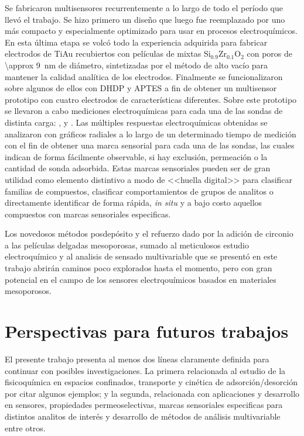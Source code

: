  Se fabricaron multisensores recurrentemente a lo largo de todo el período que llevó el trabajo. Se hizo primero un diseño que luego fue reemplazado por uno más compacto y especialmente optimizado para usar en procesos electroquímicos. En esta última etapa se volcó todo la experiencia adquirida para fabricar electrodos de Ti\textbar Au recubiertos con películas de mixtas Si$_{0.9}$Zr$_{0.1}$O$_2$ con poros de \SI{\approx 9}{\nm} de diámetro, sintetizadas por el método de alto vacío para mantener la calidad analítica de los electrodos. Finalmente se funcionalizaron sobre algunos de ellos con DHDP y APTES a fin de obtener un multisensor prototipo con cuatro electrodos de características diferentes. Sobre este prototipo se llevaron a cabo mediciones electroquímicas para cada una de las sondas de distinta carga: \ferroferri, \ferroceno\space y \aminorutenio. Las múltiples respuestas electroquímicas obtenidas se analizaron con gráficos radiales a lo largo de un determinado tiempo de medición con el fin de obtener una marca sensorial para cada una de las sondas, las cuales indican de forma fácilmente observable, si hay exclusión, permeación o la cantidad de sonda adsorbida. Estas marcas sensoriales pueden ser de gran utilidad como elemento distintivo a modo de <<huella digital>> para clasificar familias de compuestos, clasificar comportamientos de grupos de analitos o directamente identificar de forma rápida, \textit{in situ} y a bajo costo aquellos compuestos con marcas sensoriales especificas.

 Los novedosos métodos posdepósito y el refuerzo dado por la adición de circonio a las películas delgadas mesoporosas, sumado al meticulosos estudio electroquímico y al analisis de sensado multivariable que se presentó en este trabajo abrirán caminos poco explorados hasta el momento, pero con gran potencial en el campo de los sensores electrqouímicos basados en materiales mesoporosos.

\section{Perspectivas para futuros trabajos}
 
 		El presente trabajo presenta al menos dos líneas claramente definida para continuar con posibles investigaciones. La primera relacionada al estudio de la fisicoquímica en espacios confinados, transporte y cinética de adsorción/desorción por citar algunos ejemplos; y la segunda, relacionada con aplicaciones y desarrollo en sensores, propiedades permeoselectivas, marcas sensoriales especificas para distintos analitos de interés y desarrollo de métodos de análisis multivariable entre otros.
 
